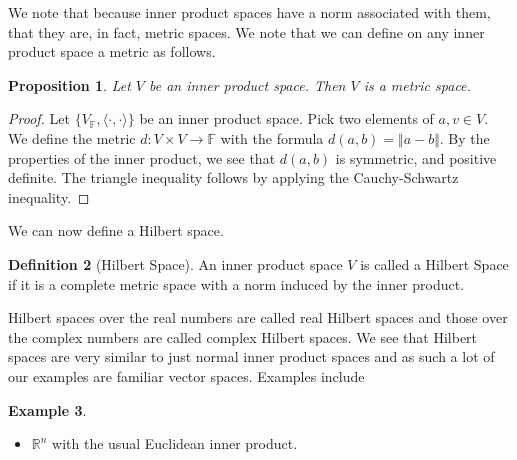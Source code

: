 \documentclass[11pt]{report}
\newtheorem{thm}{Theorem}[section]
\newtheorem{prop}[thm]{Proposition}
\theoremstyle{definition}
\newtheorem{defn}[thm]{Definition}
\newtheorem{example}[thm]{Example}
\begin{document}
We note that because inner product spaces have a norm associated with them, that they are, in fact, metric spaces. We note that we can define on any inner product space a metric as follows.
\begin{prop}
  Let $V$ be an inner product space. Then $V$ is a metric space.
\end{prop}
\begin{proof}
  Let $\{V_{\mathbb{F}},\langle \cdot,\cdot \rangle\}$ be an inner product space. Pick two elements of $a,v \in V$. We define the metric $d:V\times V \rightarrow \mathbb{F}$ with the formula $d(a,b)=\Vert a-b\Vert $. By the properties of the inner product, we see that $d(a,b)$ is symmetric, and positive definite. The triangle inequality follows by applying the Cauchy-Schwartz inequality. 
\end{proof}
We can now define a Hilbert space.
\begin{defn}[Hilbert Space]
  An inner product space $V$ is called a Hilbert Space if it is a complete metric space with a norm induced by the inner product.
\end{defn}
Hilbert spaces over the real numbers are called real Hilbert spaces and those over the complex numbers are called complex Hilbert spaces. We see that Hilbert spaces are very similar to just normal inner product spaces and as such a lot of our examples are familiar vector spaces. Examples include
\begin{example}
  \begin{itemize}
    \item $\mathbb{R}^n$ with the usual Euclidean inner product.
  \end{itemize}
\end{example}


\end{document}

